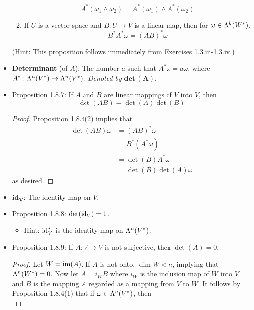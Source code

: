 \documentclass[../notes.tex]{subfiles}
\begin{document}
\begin{itemize}
\begin{enumerate}
\begin{equation*}
            A^*(\omega_1\wedge\omega_2) = A^*(\omega_1)\wedge A^*(\omega_2)
        \end{equation*}
        \item If $U$ is a vector space and $B:U\to V$ is a linear map, then for $\omega\in\lam[k]{W^*}$,
        \begin{equation*}
            B^*A^*\omega = (AB)^*\omega
        \end{equation*}
    \end{enumerate}
    (Hint: This proposition follows immediately from Exercises 1.3.iii-1.3.iv.)
    \item \textbf{Determinant} (of $A$): The number $a$ such that $A^*\omega=a\omega$, where $A^*:\lam[n]{V^*}\to\lam[n]{V^*}$. \emph{Denoted by} $\textbf{det}\,\bm{(A)}$.
    \item Proposition 1.8.7: If $A$ and $B$ are linear mappings of $V$ into $V$, then
    \begin{equation*}
        \det(AB) = \det(A)\det(B)
    \end{equation*}
    \begin{proof}
        Proposition 1.8.4(2) implies that
        \begin{align*}
            \det(AB)\omega &= (AB)^*\omega\\
            &= B^*(A^*\omega)\\
            &= \det(B)A^*\omega\\
            &= \det(B)\det(A)\omega
        \end{align*}
        as desired.
    \end{proof}
    \item $\textbf{id}_{\bm{V}}$: The identity map on $V$.
    \item Proposition 1.8.8: $\det(\id_V)=1$.
    \begin{itemize}
        \item Hint: $\id_V^*$ is the identity map on $\lam[n]{V^*}$.
    \end{itemize}
    \item Proposition 1.8.9: If $A:V\to V$ is not surjective, then $\det(A)=0$.
    \begin{proof}
        Let $W=\im(A)$. If $A$ is not onto, $\dim W<n$, implying that $\lam[n]{W^*}=0$. Now let $A=i_WB$ where $i_W$ is the inclusion map of $W$ into $V$ and $B$ is the mapping $A$ regarded as a mapping from $V$ to $W$. It follows by Proposition 1.8.4(1) that if $\omega\in\lam[n]{V^*}$, then
        \begin{equation*}

\end{equation*}
\end{proof}
\end{itemize}
\end{document}
